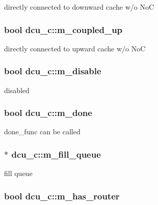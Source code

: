 \label{classdcu__c_ac252e950738034b9eab0e1774e0e7de5}
directly connected to downward cache w/o NoC \hypertarget{classdcu__c_aa455e9e2d2d70d9768b01427a5f2ce04}{
\subsubsection[{m\_\-coupled\_\-up}]{\setlength{\rightskip}{0pt plus 5cm}bool {\bf dcu\_\-c::m\_\-coupled\_\-up}}}
\label{classdcu__c_aa455e9e2d2d70d9768b01427a5f2ce04}
directly connected to upward cache w/o NoC \hypertarget{classdcu__c_af4dc606e05ca8664ef6a59027d599078}{
\subsubsection[{m\_\-disable}]{\setlength{\rightskip}{0pt plus 5cm}bool {\bf dcu\_\-c::m\_\-disable}}}
\label{classdcu__c_af4dc606e05ca8664ef6a59027d599078}
disabled \hypertarget{classdcu__c_aa0f7229cca750799c47e68e4b7025793}{
\subsubsection[{m\_\-done}]{\setlength{\rightskip}{0pt plus 5cm}bool {\bf dcu\_\-c::m\_\-done}}}
\label{classdcu__c_aa0f7229cca750799c47e68e4b7025793}
done\_\-func can be called \hypertarget{classdcu__c_a08eb24546da1c93bfbf88a9c6868930d}{
\subsubsection[{m\_\-fill\_\-queue}]{$\ast$ {\bf dcu\_\-c::m\_\-fill\_\-queue}}}
\label{classdcu__c_a08eb24546da1c93bfbf88a9c6868930d}
fill queue \hypertarget{classdcu__c_afd4171d11831e26978f2ce21659b17f8}{
\subsubsection[{m\_\-has\_\-router}]{\setlength{\rightskip}{0pt plus 5cm}bool {\bf dcu\_\-c::m\_\-has\_\-router}}}
